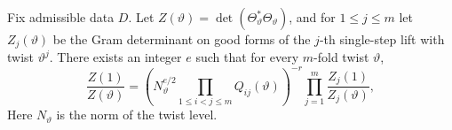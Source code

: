 \begin{lemma}
\label{lem:c-chain-factorization}
\emitthmsource
Fix admissible data $D$. Let $Z(\vartheta)=\det(\Theta_\vartheta^*\Theta_\vartheta)$, and for $1\le j\le m$ let $Z_j(\vartheta)$ be the Gram determinant on good forms of the $j$-th single-step lift with twist $\vartheta^j$. There exists an integer $e$ such that for every $m$-fold twist $\vartheta$,
\begin{equation}
 \frac{Z(1)}{Z(\vartheta)}
 =\left(N_\vartheta^{e/2}
          \prod_{1\le i<j\le m}Q_{ij}(\vartheta)\right)^{-r}
       \prod_{j=1}^m \frac{Z_j(1)}{Z_j(\vartheta)},
\label{eq:c-chain-ratio}
\end{equation}
Here $N_\vartheta$ is the norm of the twist level.
\end{lemma}
